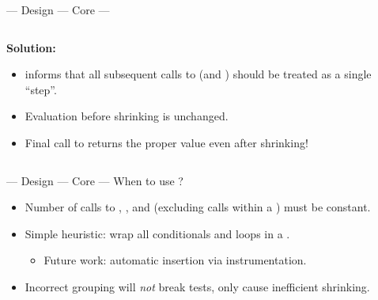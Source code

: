\begin{frame}[fragile,t]{\halcheck{} --- Design --- Core --- }
\begin{columns}[T]
\begin{overprint}
      \textbf{Solution:} 
      \begin{itemize}
        \item<8->  informs \halcheck{} that all subsequent calls to  (and ) should be treated as a single ``step''.
        \item<9-> Evaluation before shrinking is unchanged.
        \item<10-> Final call to  returns the proper value even after shrinking!
      \end{itemize}
    \end{overprint}
  \end{columns}
\end{frame}

\begin{frame}[fragile,t]{\halcheck{} --- Design --- Core --- }
  When to use ?
  \begin{itemize}
    \item Number of calls to , , and  (excluding calls within a ) must be \alert{constant}.
    \item Simple heuristic: wrap all conditionals and loops in a .
    \begin{itemize}
      \item Future work: automatic  insertion via instrumentation.
    \end{itemize}
    \item Incorrect grouping will \emph{not} break tests, only cause inefficient shrinking.
  \end{itemize}
\end{frame}

